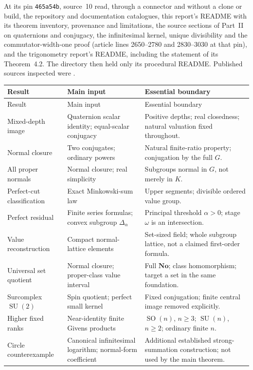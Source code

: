 \documentclass[11pt,letterpaper]{article}
\numberwithin{equation}{section}
\theoremstyle{definition}
\theoremstyle{remark}
\newcommand{\No}{\mathbf{No}}
\newcommand{\SO}{\operatorname{SO}}
\newcommand{\SU}{\operatorname{SU}}
\begin{document}
At its pin \texttt{465a54b}, source~10 read, through a connector and without a
clone or build, the repository and documentation catalogues, this report's
README with its theorem inventory, provenance and limitations, the source
sections of Part~II on quaternions and conjugacy, the infinitesimal kernel,
unique divisibility and the commutator-width-one proof (article lines 2650--2780
and 2830--3030 at that pin), and the trigonometry report's README, including the
statement of its Theorem~4.2. The  directory then held only its
procedural README. Published sources inspected were \cite{DM,BP,BG}.

\begin{longtable}{L{0.26\textwidth}L{0.3\textwidth}L{0.35\textwidth}}
\toprule
Result & Main input & Essential boundary\\
\midrule
\endfirsthead
\toprule Result & Main input & Essential boundary\\\midrule
\endhead
Mixed-depth image & Quaternion scalar identity; equal-scalar conjugacy & Positive depths; real closedness; natural valuation fixed throughout.\\
Normal closure & Two conjugates; ordinary powers & Natural finite-ratio property; conjugation by the full $G$.\\
All proper normals & Normal closure; real simplicity & Subgroups normal in $G$, not merely in $K$.\\
Perfect-cut classification & Exact Minkowski-sum law & Upper segments; divisible ordered value group.\\
Perfect residual & Finite series formulas; convex subgroup $\Delta_\alpha$ & Principal threshold $\alpha>0$; stage $\omega$ is an intersection.\\
Value reconstruction & Compact normal-lattice elements & Set-sized field; whole subgroup lattice, not a claimed first-order formula.\\
Universal set quotient & Normal closure; proper-class value interval & Full $\No$; class homomorphism; target a set in the same foundation.\\
Surcomplex $\SU(2)$ & Spin quotient; perfect small kernel & Fixed conjugation; finite central image removed explicitly.\\
Higher fixed ranks & Near-identity finite Givens products & $\SO(n)$, $n\ge3$; $\SU(n)$, $n\ge2$; ordinary finite $n$.\\
Circle counterexample & Canonical infinitesimal logarithm; normal-form coefficient & Additional established strong-summation construction; not used by the main theorem.\\
\bottomrule
\end{longtable}
\end{document}
